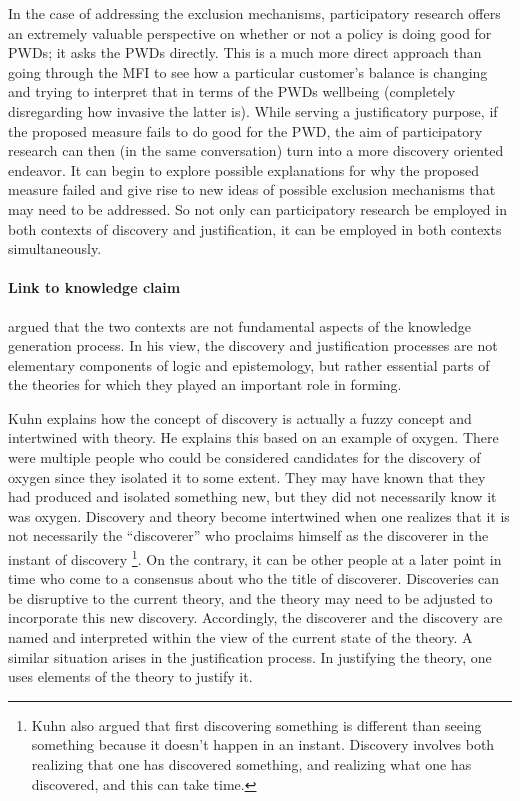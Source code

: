 \documentclass[a4paper]{article}
\begin{document}
In the case of addressing the exclusion mechanisms, participatory research
offers an extremely valuable perspective on whether or not a policy is doing
good for PWDs; it asks the PWDs directly. This is a much more direct approach
than going through the MFI to see how a particular customer's balance is
changing and trying to interpret that in terms of the PWDs wellbeing
(completely disregarding how invasive the latter is). While serving a
justificatory purpose, if the proposed measure fails to do good for the PWD,
the aim of participatory research can then (in the same conversation) turn
into a more discovery oriented endeavor. It can begin to explore possible
explanations for why the proposed measure failed and give rise to new ideas of
possible exclusion mechanisms that may need to be addressed. So not only can
participatory research be employed in both contexts of discovery and
justification, it can be employed in both contexts simultaneously.


\paragraph{Link to knowledge claim}

\cite{kuhn2012structure} argued that the two contexts are not fundamental
aspects of the knowledge generation process. In his view, the discovery and
justification processes are not elementary components of logic and
epistemology, but rather essential parts of the theories for which they played
an important role in forming.

Kuhn explains how the concept of discovery is actually a fuzzy concept and
intertwined with theory. He explains this based on an example of oxygen.
There were multiple people who could be considered candidates for the
discovery of oxygen since they isolated it to some extent. They may have known
that they had produced and isolated something new, but they did not
necessarily know it was oxygen. Discovery and theory become intertwined when
one realizes that it is not necessarily the ``discoverer'' who proclaims
himself as the discoverer in the instant of discovery
    \footnote{Kuhn also argued that first discovering something is different
        than seeing something because it doesn't happen in an instant.
        Discovery involves both realizing that one has discovered something,
        and realizing what one has discovered, and this can take time.}.
On the contrary, it can be other people at a later point in time who come to a
consensus about who the title of discoverer. Discoveries can be disruptive to
the current theory, and the theory may need to be adjusted to incorporate this
new discovery. Accordingly, the discoverer and the discovery are named and
interpreted within the view of the current state of the theory. A similar
situation arises in the justification process. In justifying the theory, one
uses elements of the theory to justify it.
\end{document}
